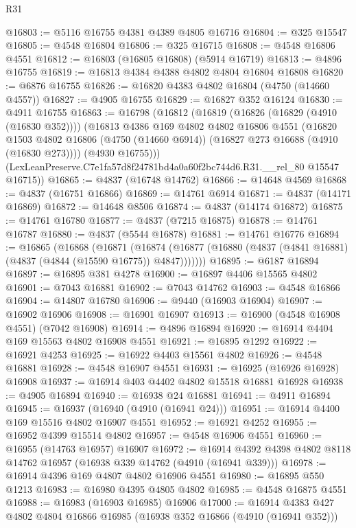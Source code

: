 \begin{lexlean}{R31}
\begin{coremodule}
@16803 := @5116 @16755 @4381 @4389 @4805 @16716
@16804 := @325 @15547
@16805 := @4548 @16804
@16806 := @325 @16715
@16808 := @4548 @16806 @4551
@16812 := @16803 (@16805 @16808) (@5914 @16719)
@16813 := @4896 @16755
@16819 := @16813 @4384 @4388 @4802 @4804 @16804 @16808
@16820 := @6876 @16755
@16826 := @16820 @4383 @4802 @16804 (@4750 (@14660 @4557))
@16827 := @4905 @16755
@16829 := @16827 @352 @16124
@16830 := @4911 @16755
@16863 := @16798
    (@16812
      (@16819
        (@16826 (@16829 (@4910 (@16830 @352))))
        (@16813
          @4386
          @169
          @4802
          @4802
          @16806
          @4551
          (@16820
            @1503
            @4802
            @16806
            (@4750 (@14660 @6914))
            (@16827 @273 @16688 (@4910 (@16830 @273))))
          (@4930 @16755)))
      (LexLeanPreserve.C7e1fa57d8f24781bd4a0a60f2bc744d6.R31.__rel_80 @15547 @16715))
@16865 := @4837 (@16748 @14762)
@16866 := @14648 @4569
@16868 := @4837 (@16751 @16866)
@16869 := @14761 @6914
@16871 := @4837 (@14171 @16869)
@16872 := @14648 @8506
@16874 := @4837 (@14174 @16872)
@16875 := @14761 @16780
@16877 := @4837 (@7215 @16875)
@16878 := @14761 @16787
@16880 := @4837 (@5544 @16878)
@16881 := @14761 @16776
@16894 := @16865
    (@16868
      (@16871
        (@16874 (@16877 (@16880 (@4837 (@4841 @16881) (@4837 (@4844 (@15590 @16775)) @4847)))))))
@16895 := @6187 @16894
@16897 := @16895 @381 @4278
@16900 := @16897 @4406 @15565 @4802
@16901 := @7043 @16881
@16902 := @7043 @14762
@16903 := @4548 @16866
@16904 := @14807 @16780
@16906 := @9440 (@16903 @16904)
@16907 := @16902 @16906
@16908 := @16901 @16907
@16913 := @16900 (@4548 @16908 @4551) (@7042 @16908)
@16914 := @4896 @16894
@16920 := @16914 @4404 @169 @15563 @4802 @16908 @4551
@16921 := @16895 @1292
@16922 := @16921 @4253
@16925 := @16922 @4403 @15561 @4802
@16926 := @4548 @16881
@16928 := @4548 @16907 @4551
@16931 := @16925 (@16926 @16928) @16908
@16937 := @16914 @403 @4402 @4802 @15518 @16881 @16928
@16938 := @4905 @16894
@16940 := @16938 @24 @16881
@16941 := @4911 @16894
@16945 := @16937 (@16940 (@4910 (@16941 @24)))
@16951 := @16914 @4400 @169 @15516 @4802 @16907 @4551
@16952 := @16921 @4252
@16955 := @16952 @4399 @15514 @4802
@16957 := @4548 @16906 @4551
@16960 := @16955 (@14763 @16957) @16907
@16972 := @16914 @4392 @4398 @4802 @8118 @14762 @16957 (@16938 @339 @14762 (@4910 (@16941 @339)))
@16978 := @16914 @4396 @169 @4807 @4802 @16906 @4551
@16980 := @16895 @550 @1213
@16983 := @16980 @4395 @4805 @4802
@16985 := @4548 @16875 @4551
@16988 := @16983 (@16903 @16985) @16906
@17000 := @16914 @4383 @427 @4802 @4804 @16866 @16985 (@16938 @352 @16866 (@4910 (@16941 @352)))

\end{coremodule}
\end{lexlean}
